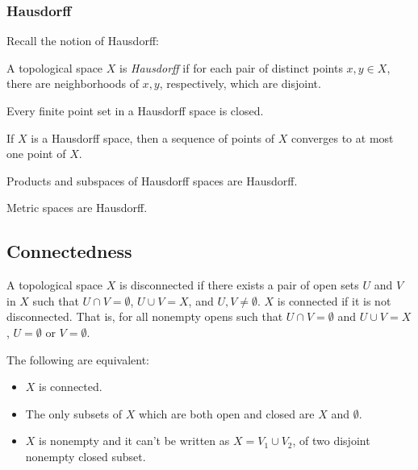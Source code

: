 \subsubsection{Hausdorff}

Recall the notion of Hausdorff:

\begin{df}
    A topological space $X$ is \emph{Hausdorff} if for each pair of distinct 
    points $x,y \in X$, there are neighborhoods of $x,y$, respectively, 
    which are disjoint.
\end{df}

\begin{theorem}
    Every finite point set in a Hausdorff space is closed.
\end{theorem}

\begin{theorem}
    If $X$ is a Hausdorff space, then a sequence of points of $X$ converges 
    to at most one point of $X$.
\end{theorem}

\begin{proposition}
    Products and subspaces of Hausdorff spaces are Hausdorff.
\end{proposition}

\begin{proposition}
Metric spaces are Hausdorff.
\end{proposition}

\subsection{Connectedness}

\begin{df}
A topological space $X$ is disconnected if there exists a pair of open sets $U$ and $V$ in $X$ such that
$U \cap V = \emptyset$, $U \cup V = X$, and $U, V \neq \emptyset$. $X$ is connected if it is not disconnected. That is, for all nonempty opens such 
that $U \cap V = \emptyset$ and $U \cup V = X$, $U = \emptyset$ or $V = \emptyset$.
\end{df}

\begin{proposition}
The following are equivalent:
\begin{itemize}
    \item $X$ is connected.
    \item The only subsets of $X$ which are both open and closed are $X$ and $\emptyset$.
    \item $X$ is nonempty and it can't be written as $X = V_1 \cup V_2$, of two disjoint nonempty closed subset.
\end{itemize}
\end{proposition}

